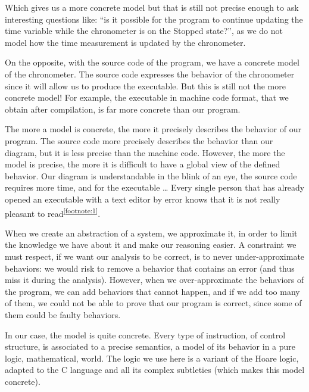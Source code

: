 Which gives us a more concrete model but that is still not precise
enough to ask interesting questions like: ``is it possible for the program
to continue updating the time variable while the chronometer is on the Stopped
state?'', as we do not model how the time measurement is updated by the
chronometer.



On the opposite, with the source code of the program, we have a concrete
model of the chronometer. The source code expresses the behavior of the
chronometer since it will allow us to produce the executable. But this
is still not the more concrete model! For example, the executable in
machine code format, that we obtain after compilation, is far more
concrete than our program.



The more a model is concrete, the more it precisely describes the
behavior of our program. The source code more precisely describes the
behavior than our diagram, but it is less precise than the machine code.
However, the more the model is precise, the more it is difficult to have
a global view of the defined behavior. Our diagram is understandable in
the blink of an eye, the source code requires more time, and for the
executable \ldots{} Every single person that has already opened an
executable with a text editor by error knows that it is not really
pleasant to read\textsuperscript{\ref{footnote:1}}.



When we create an abstraction of a system, we approximate it, in order
to limit the knowledge we have about it and make our reasoning easier. A
constraint we must respect, if we want our analysis to be correct, is to
never under-approximate behaviors: we would risk to remove a behavior
that contains an error (and thus miss it during the analysis). However,
when we over-approximate the behaviors of the program, we can add
behaviors that cannot happen, and if we add too many of them, we could
not be able to prove that our program is correct, since some of them could be
faulty behaviors.



In our case, the model is quite concrete. Every type of instruction, of
control structure, is associated to a precise semantics, a model of its
behavior in a pure logic, mathematical, world. The logic we use here is
a variant of the Hoare logic, adapted to the C language and all its
complex subtleties (which makes this model concrete).




